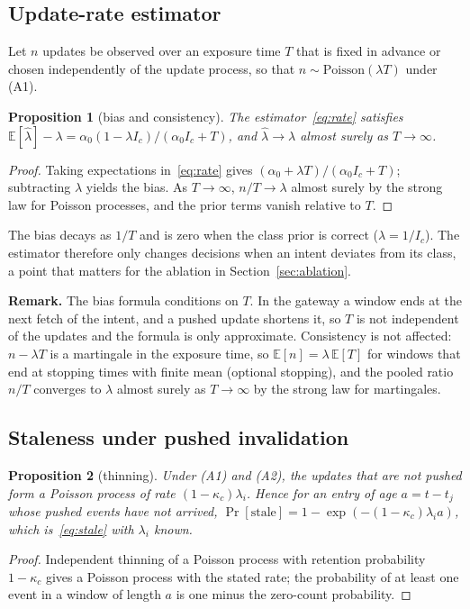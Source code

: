 \documentclass[journal]{IEEEtran}
\newtheorem{proposition}{Proposition}
\newcommand{\hatlam}{\hat{\lambda}}
\begin{document}
\subsection{Update-rate estimator}\label{sec:estimator}
Let $n$ updates be observed over an exposure time $T$ that is fixed in advance or chosen independently of the update process, so that $n\sim\mathrm{Poisson}(\lambda T)$ under (A1).

\begin{proposition}[bias and consistency]\label{prop:bias}
The estimator~\eqref{eq:rate} satisfies $\mathbb{E}[\hatlam]-\lambda=\alpha_0(1-\lambda I_c)/(\alpha_0 I_c+T)$, and $\hatlam\to\lambda$ almost surely as $T\to\infty$.
\end{proposition}
\begin{proof}
Taking expectations in~\eqref{eq:rate} gives $(\alpha_0+\lambda T)/(\alpha_0 I_c+T)$; subtracting $\lambda$ yields the bias. As $T\to\infty$, $n/T\to\lambda$ almost surely by the strong law for Poisson processes, and the prior terms vanish relative to $T$.
\end{proof}
The bias decays as $1/T$ and is zero when the class prior is correct ($\lambda=1/I_c$). The estimator therefore only changes decisions when an intent deviates from its class, a point that matters for the ablation in Section~\ref{sec:ablation}.

\textbf{Remark.} The bias formula conditions on $T$. In the gateway a window ends at the next fetch of the intent, and a pushed update shortens it, so $T$ is not independent of the updates and the formula is only approximate. Consistency is not affected: $n-\lambda T$ is a martingale in the exposure time, so $\mathbb{E}[n]=\lambda\,\mathbb{E}[T]$ for windows that end at stopping times with finite mean (optional stopping), and the pooled ratio $n/T$ converges to $\lambda$ almost surely as $T\to\infty$ by the strong law for martingales.

\subsection{Staleness under pushed invalidation}\label{sec:thinning}
\begin{proposition}[thinning]\label{prop:thin}
Under (A1) and (A2), the updates that are not pushed form a Poisson process of rate $(1-\kappa_c)\lambda_i$. Hence for an entry of age $a=t-t_j$ whose pushed events have not arrived, $\Pr[\text{stale}]=1-\exp(-(1-\kappa_c)\lambda_i a)$, which is~\eqref{eq:stale} with $\lambda_i$ known.
\end{proposition}
\begin{proof}
Independent thinning of a Poisson process with retention probability $1-\kappa_c$ gives a Poisson process with the stated rate; the probability of at least one event in a window of length $a$ is one minus the zero-count probability.
\end{proof}
\end{document}
